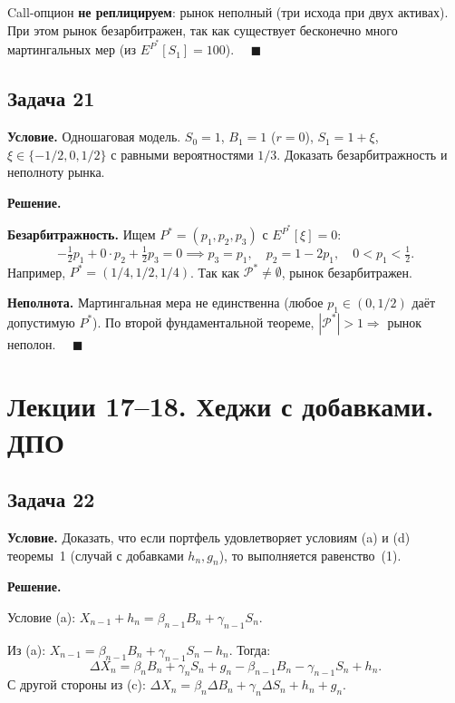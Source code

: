 \documentclass[12pt,a4paper]{article}
\theoremstyle{zadacha}
\begin{document}
Call-опцион \textbf{не реплицируем}: рынок неполный (три исхода при двух активах). При этом рынок безарбитражен, так как существует бесконечно много мартингальных мер (из $E^{P^*}[S_1] = 100$). $\quad\blacksquare$

\subsection*{Задача 21}

\textbf{Условие.} Одношаговая модель. $S_0 = 1$, $B_1 = 1$ ($r = 0$), $S_1 = 1 + \xi$, $\xi \in \{-1/2, 0, 1/2\}$ с равными вероятностями $1/3$. Доказать безарбитражность и неполноту рынка.

\medskip
\textbf{Решение.}

\textbf{Безарбитражность.} Ищем $P^* = (p_1, p_2, p_3)$ с $E^{P^*}[\xi] = 0$:
\[
-\tfrac{1}{2} p_1 + 0 \cdot p_2 + \tfrac{1}{2} p_3 = 0 \implies p_3 = p_1, \quad p_2 = 1 - 2p_1, \quad 0 < p_1 < \tfrac{1}{2}.
\]
Например, $P^* = (1/4, 1/2, 1/4)$. Так как $\mathcal{P}^* \neq \emptyset$, рынок безарбитражен.

\textbf{Неполнота.} Мартингальная мера не единственна (любое $p_1 \in (0, 1/2)$ даёт допустимую $P^*$). По второй фундаментальной теореме, $|\mathcal{P}^*| > 1 \Rightarrow$ рынок неполон. $\quad\blacksquare$

\section{Лекции 17–18. Хеджи с добавками. ДПО}

\subsection*{Задача 22}

\textbf{Условие.} Доказать, что если портфель удовлетворяет условиям (a) и (d) теоремы~1 (случай с добавками $h_n, g_n$), то выполняется равенство~(1).

\medskip
\textbf{Решение.}

Условие (a): $X_{n-1} + h_n = \beta_{n-1} B_n + \gamma_{n-1} S_n$.

Из (a): $X_{n-1} = \beta_{n-1} B_n + \gamma_{n-1} S_n - h_n$. Тогда:
\[
\Delta X_n = \beta_n B_n + \gamma_n S_n + g_n - \beta_{n-1} B_n - \gamma_{n-1} S_n + h_n.
\]
С другой стороны из (c): $\Delta X_n = \beta_n \Delta B_n + \gamma_n \Delta S_n + h_n + g_n$.
\end{document}
